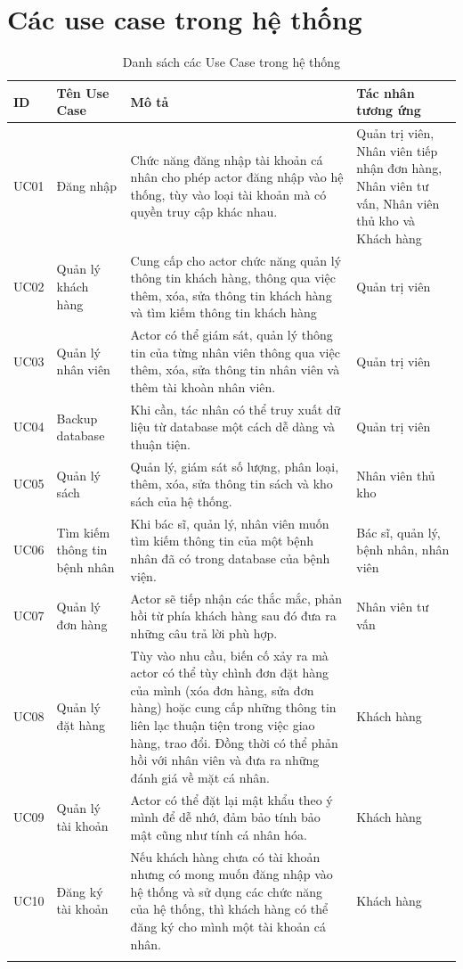 \documentclass{report}
\begin{document}
\section{Các use case trong hệ thống}
\begin{center}
	\fontsize{13}{15}\selectfont
	\begin{longtable}{|m{1.4cm}|m{2.5cm}|m{6.5cm}|m{4.5cm}|} 
		\hline
			\centering\textbf{ID} & \centering\textbf{Tên Use Case} & \centering\textbf{Mô tả} & \centerline{\textbf{Tác nhân tương ứng}}\\
		\hline
			UC01 & Đăng nhập
			& Chức năng đăng nhập tài khoản cá nhân cho phép actor đăng nhập vào hệ thống, tùy vào loại tài khoản mà có quyền truy cập khác nhau. & Quản trị viên, Nhân viên tiếp nhận đơn hàng, Nhân viên tư vấn, Nhân viên thủ kho và Khách hàng \\ 
		\hline
			UC02 & Quản lý khách hàng
			& Cung cấp cho actor chức năng quản lý thông tin khách hàng, thông qua việc thêm, xóa, sửa thông tin khách hàng và tìm kiếm thông tin khách hàng & Quản trị viên \\ 
		\hline
			UC03 & Quản lý nhân viên
			& Actor có thể giám sát, quản lý thông tin của từng nhân viên thông qua việc thêm, xóa, sửa thông tin nhân viên và thêm tài khoàn nhân viên. & Quản trị viên\\ 
		\hline
			UC04 & Backup database
			& Khi cần, tác nhân có thể truy xuất dữ liệu từ database một cách dễ dàng và thuận tiện. & Quản trị viên\\ 
		\hline
			UC05 & Quản lý sách
			& Quản lý, giám sát số lượng, phân loại, thêm, xóa, sửa thông tin sách và kho sách của hệ thống. &Nhân viên thủ kho \\ 
		\hline
			UC06 & Tìm kiếm thông tin bệnh nhân
			& Khi bác sĩ, quản lý, nhân viên muốn tìm kiếm thông tin của một bệnh nhân đã có trong database của bệnh viện. & Bác sĩ, quản lý, bệnh nhân, nhân viên\\ 
		\hline
			UC07 & Quản lý đơn hàng
			& Actor sẽ tiếp nhận các thắc mắc, phản hồi từ phía khách hàng sau đó đưa ra những câu trả lời phù hợp. &Nhân viên tư vấn \\ 
		\hline
			UC08 & Quản lý đặt hàng
			& Tùy vào nhu cầu, biến cố xảy ra mà actor có thể tùy chình đơn đặt hàng của mình (xóa đơn hàng, sửa đơn hàng) hoặc cung cấp những thông tin liên lạc thuận tiện trong việc giao hàng, trao đổi. Đồng thời có thể phản hồi với nhân viên và đưa ra những đánh giá về mặt cá nhân. & Khách hàng \\ 
		\hline
			UC09 & Quản lý tài khoản
			& Actor có thể đặt lại mật khẩu theo ý mình để dễ nhớ, đảm bảo tính bảo mật cũng như tính cá nhân hóa. & Khách hàng \\ 
		\hline
			UC10 & Đăng ký tài khoản
			& Nếu khách hàng chưa có tài khoản nhưng có mong muốn đăng nhập vào hệ thống và sử dụng các chức năng của hệ thống, thì khách hàng có thể đăng ký cho mình một tài khoản cá nhân. & Khách hàng\\ 
		\hline
		\caption{Danh sách các Use Case trong hệ thống}
	\end{longtable}
\end{center}
\end{document}
